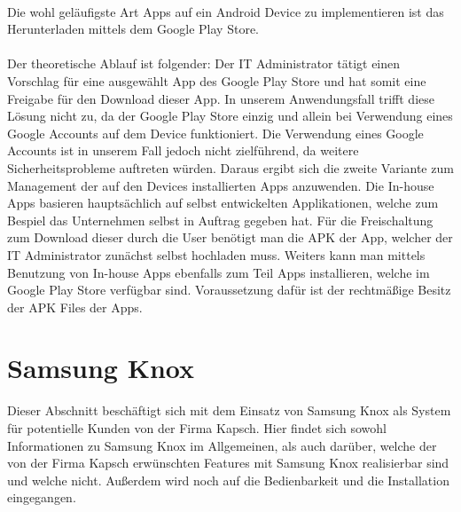 \paragraph*{}
Die wohl geläufigste Art Apps auf ein Android Device zu implementieren ist das Herunterladen mittels dem Google Play Store.
\paragraph*{}
Der theoretische Ablauf ist folgender: Der IT Administrator tätigt einen Vorschlag für eine ausgewählt App des Google Play Store und hat somit eine Freigabe für den Download dieser App. In unserem Anwendungsfall trifft diese Lösung nicht zu, da der Google Play Store einzig und allein bei Verwendung eines Google Accounts auf dem Device funktioniert. Die Verwendung eines Google Accounts ist in unserem Fall jedoch nicht zielführend, da weitere Sicherheitsprobleme auftreten würden. Daraus ergibt sich die zweite Variante zum Management der auf den Devices installierten Apps anzuwenden. Die In-house Apps basieren hauptsächlich auf selbst entwickelten Applikationen, welche zum Bespiel das Unternehmen selbst in Auftrag gegeben hat. Für die Freischaltung zum Download dieser durch die User benötigt man die APK der App, welcher der IT Administrator zunächst selbst hochladen muss. Weiters kann man mittels Benutzung von In-house Apps ebenfalls zum Teil Apps installieren, welche im Google Play Store verfügbar sind. Voraussetzung dafür ist der rechtmäßige Besitz der APK Files der Apps.

\newpage
\section{Samsung Knox}
Dieser Abschnitt beschäftigt sich mit dem Einsatz von Samsung Knox als System für potentielle Kunden von der Firma Kapsch. Hier findet sich sowohl Informationen zu Samsung Knox im Allgemeinen, als auch darüber, welche der von der Firma Kapsch erwünschten Features mit Samsung Knox realisierbar sind und welche nicht. Außerdem wird noch auf die Bedienbarkeit und die Installation eingegangen.
